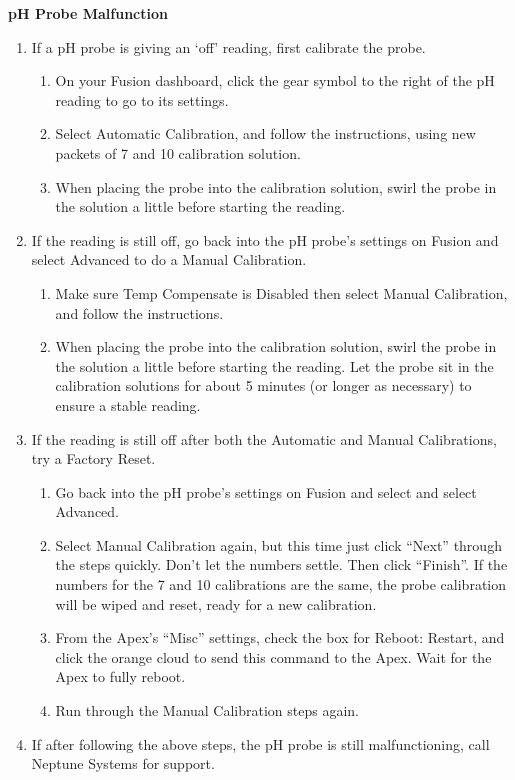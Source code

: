 \documentclass[
]{book}
\providecommand{\tightlist}{%
  \setlength{\itemsep}{0pt}\setlength{\parskip}{0pt}}
\begin{document}
\textbf{pH Probe Malfunction}

\begin{enumerate}
\def\labelenumi{\arabic{enumi}.}
\tightlist
\item
  If a pH probe is giving an `off' reading, first calibrate the probe.

  \begin{enumerate}
  \def\labelenumii{\arabic{enumii}.}
  \tightlist
  \item
    On your Fusion dashboard, click the gear symbol to the right of the pH reading to go to its settings.
  \item
    Select Automatic Calibration, and follow the instructions, using new packets of 7 and 10 calibration solution.
  \item
    When placing the probe into the calibration solution, swirl the probe in the solution a little before starting the reading.
  \end{enumerate}
\item
  If the reading is still off, go back into the pH probe's settings on Fusion and select Advanced to do a Manual Calibration.

  \begin{enumerate}
  \def\labelenumii{\arabic{enumii}.}
  \tightlist
  \item
    Make sure Temp Compensate is Disabled then select Manual Calibration, and follow the instructions.
  \item
    When placing the probe into the calibration solution, swirl the probe in the solution a little before starting the reading. Let the probe sit in the calibration solutions for about 5 minutes (or longer as necessary) to ensure a stable reading.
  \end{enumerate}
\item
  If the reading is still off after both the Automatic and Manual Calibrations, try a Factory Reset.

  \begin{enumerate}
  \def\labelenumii{\arabic{enumii}.}
  \tightlist
  \item
    Go back into the pH probe's settings on Fusion and select and select Advanced.
  \item
    Select Manual Calibration again, but this time just click ``Next'' through the steps quickly. Don't let the numbers settle. Then click ``Finish''. If the numbers for the 7 and 10 calibrations are the same, the probe calibration will be wiped and reset, ready for a new calibration.
  \item
    From the Apex's ``Misc'' settings, check the box for Reboot: Restart, and click the orange cloud to send this command to the Apex. Wait for the Apex to fully reboot.
  \item
    Run through the Manual Calibration steps again.
  \end{enumerate}
\item
  If after following the above steps, the pH probe is still malfunctioning, call Neptune Systems for support.
\end{enumerate}
\end{document}
